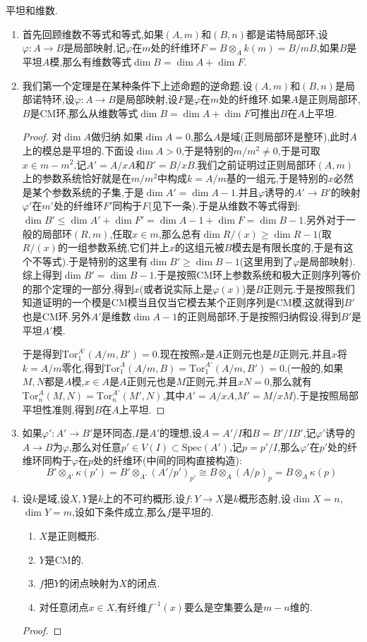 平坦和维数.
\begin{enumerate}
	\item 首先回顾维数不等式和等式,如果$(A,m)$和$(B,n)$都是诺特局部环,设$\varphi:A\to B$是局部映射,记$\varphi$在$m$处的纤维环$F=B\otimes_Ak(m)=B/mB$,如果$B$是平坦$A$模,那么有维数等式$\dim B=\dim A+\dim F$.
	\item 我们第一个定理是在某种条件下上述命题的逆命题.设$(A,m)$和$(B,n)$是局部诺特环,设$\varphi:A\to B$是局部映射,设$F$是$\varphi$在$m$处的纤维环.如果$A$是正则局部环,$B$是CM环,那么从维数等式$\dim B=\dim A+\dim F$可推出$B$在$A$上平坦.
	\begin{proof}
		
		对$\dim A$做归纳.如果$\dim A=0$,那么$A$是域(正则局部环是整环),此时$A$上的模总是平坦的.下面设$\dim A>0$,于是特别的$m/m^2\not=0$,于是可取$x\in m-m^2$,记$A'=A/xA$和$B'=B/xB$.我们之前证明过正则局部环$(A,m)$上的参数系统恰好就是在$m/m^2$中构成$k=A/m$基的一组元,于是特别的$x$必然是某个参数系统的子集,于是$\dim A'=\dim A-1$.并且$\varphi$诱导的$A'\to B'$的映射$\varphi'$在$m'$处的纤维环$F'$同构于$F$(见下一条).于是从维数不等式得到:$\dim B'\le\dim A'+\dim F'=\dim A-1+\dim F=\dim B-1$.另外对于一般的局部环$(R,m)$,任取$x\in m$,那么总有$\dim R/(x)\ge\dim R-1$(取$R/(x)$的一组参数系统,它们并上$x$的这组元被$B$模去是有限长度的,于是有这个不等式).于是特别的这里有$\dim B'\ge\dim B-1$(这里用到了$\varphi$是局部映射).综上得到$\dim B'=\dim B-1$.于是按照CM环上参数系统和极大正则序列等价的那个定理的一部分,得到$x$(或者说实际上是$\varphi(x)$)是$B$正则元.于是按照我们知道证明的一个模是CM模当且仅当它模去某个正则序列是CM模,这就得到$B'$也是CM环.另外$A'$是维数$\dim A-1$的正则局部环,于是按照归纳假设,得到$B'$是平坦$A'$模.
		
		于是得到$\mathrm{Tor}_1^{A'}(A/m,B')=0$.现在按照$x$是$A$正则元也是$B$正则元,并且$x$将$k=A/m$零化,得到$\mathrm{Tor}_1^{A}(A/m,B)=\mathrm{Tor}_1^{A'}(A/m,B')=0$.(一般的,如果$M,N$都是$A$模,$x\in A$是$A$正则元也是$M$正则元,并且$xN=0$,那么就有$\mathrm{Tor}_n^A(M,N)=\mathrm{Tor}_n^{A'}(M',N)$,其中$A'=A/xA$,$M'=M/xM$).于是按照局部平坦性准则,得到$B$在$A$上平坦.
	\end{proof}
    \item 如果$\varphi':A'\to B'$是环同态,$I$是$A'$的理想,设$A=A'/I$和$B=B'/IB'$,记$\varphi'$诱导的$A\to B$为$\varphi$,那么对任意$p'\in V(I)\subset\mathrm{Spec}(A')$,记$p=p'/I$,那么$\varphi'$在$p'$处的纤维环同构于$\varphi$在$p$处的纤维环(中间的同构直接构造):
    $$B'\otimes_{A'}\kappa(p')=B'\otimes_{A'}(A'/p')_{p'}\cong B\otimes_A(A/p)_p=B\otimes_A\kappa(p)$$
    \item 设$k$是域,设$X,Y$是$k$上的不可约概形,设$f:Y\to X$是$k$概形态射,设$\dim X=n$,$\dim Y=m$,设如下条件成立,那么$f$是平坦的.
    \begin{enumerate}
    	\item $X$是正则概形.
    	\item $Y$是CM的.
    	\item $f$把$Y$的闭点映射为$X$的闭点.
    	\item 对任意闭点$x\in X$,有纤维$f^{-1}(x)$要么是空集要么是$m-n$维的.
    \end{enumerate}
    \begin{proof}
    	

\end{proof}
\end{enumerate}
